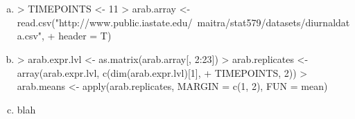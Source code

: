 \documentclass{article}
\begin{document}
    \section{}
    \begin{enumerate}[(a)]
    \item
\begin{Schunk}
\begin{Sinput}
> TIMEPOINTS <- 11
> arab.array <- read.csv("http://www.public.iastate.edu/~maitra/stat579/datasets/diurnaldata.csv", 
+     header = T)
\end{Sinput}
\end{Schunk}
    \item
\begin{Schunk}
\begin{Sinput}
> arab.expr.lvl <- as.matrix(arab.array[, 2:23])
> arab.replicates <- array(arab.expr.lvl, c(dim(arab.expr.lvl)[1], 
+     TIMEPOINTS, 2))
> arab.means <- apply(arab.replicates, MARGIN = c(1, 2), FUN = mean)
\end{Sinput}
\end{Schunk}
    \item 
    \begin{inparaenum}
        \item[(d)]
        \item[(e)]
    \end{inparaenum}
    blah
    \end{enumerate}
\end{document}
